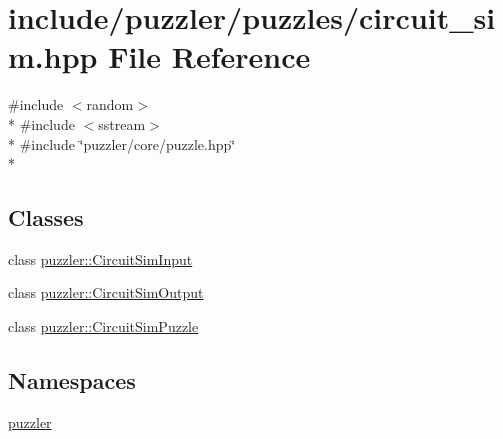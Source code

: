 \hypertarget{a00129}{}\section{include/puzzler/puzzles/circuit\+\_\+sim.hpp File Reference}
\label{a00129}
{\ttfamily \#include $<$random$>$}\\*
{\ttfamily \#include $<$sstream$>$}\\*
{\ttfamily \#include \char`\"{}puzzler/core/puzzle.\+hpp\char`\"{}}\\*
\subsection*{Classes}
\begin{DoxyCompactItemize}
\item 
class \hyperlink{a00003}{puzzler\+::\+Circuit\+Sim\+Input}
\item 
class \hyperlink{a00004}{puzzler\+::\+Circuit\+Sim\+Output}
\item 
class \hyperlink{a00006}{puzzler\+::\+Circuit\+Sim\+Puzzle}
\end{DoxyCompactItemize}
\subsection*{Namespaces}
\begin{DoxyCompactItemize}
\item 
 \hyperlink{a00145}{puzzler}
\end{DoxyCompactItemize}
